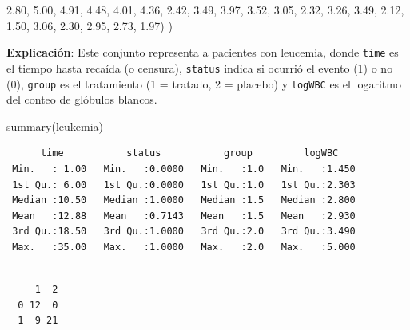 \documentclass[
]{article}
\newenvironment{Shaded}{\begin{snugshade}}{\end{snugshade}}
\newcommand{\FloatTok}[1]{\textcolor[rgb]{0.68,0.00,0.00}{#1}}
\newcommand{\FunctionTok}[1]{\textcolor[rgb]{0.28,0.35,0.67}{#1}}
\newcommand{\NormalTok}[1]{\textcolor[rgb]{0.00,0.23,0.31}{#1}}
\newcommand{\SpecialCharTok}[1]{\textcolor[rgb]{0.37,0.37,0.37}{#1}}
\begin{document}
\begin{Shaded}
\begin{Highlighting}[]
             \FloatTok{2.80}\NormalTok{, }\FloatTok{5.00}\NormalTok{, }\FloatTok{4.91}\NormalTok{, }\FloatTok{4.48}\NormalTok{, }\FloatTok{4.01}\NormalTok{, }\FloatTok{4.36}\NormalTok{, }\FloatTok{2.42}\NormalTok{, }\FloatTok{3.49}\NormalTok{, }\FloatTok{3.97}\NormalTok{, }
             \FloatTok{3.52}\NormalTok{, }\FloatTok{3.05}\NormalTok{, }\FloatTok{2.32}\NormalTok{, }\FloatTok{3.26}\NormalTok{, }\FloatTok{3.49}\NormalTok{, }\FloatTok{2.12}\NormalTok{, }\FloatTok{1.50}\NormalTok{, }\FloatTok{3.06}\NormalTok{, }\FloatTok{2.30}\NormalTok{, }\FloatTok{2.95}\NormalTok{, }\FloatTok{2.73}\NormalTok{, }\FloatTok{1.97}\NormalTok{)}
\NormalTok{)}
\end{Highlighting}
\end{Shaded}

\textbf{Explicación}: Este conjunto representa a pacientes con leucemia,
donde \texttt{time} es el tiempo hasta recaída (o censura),
\texttt{status} indica si ocurrió el evento (1) o no (0), \texttt{group}
es el tratamiento (1 = tratado, 2 = placebo) y \texttt{logWBC} es el
logaritmo del conteo de glóbulos blancos.

\begin{Shaded}
\begin{Highlighting}[]
\FunctionTok{summary}\NormalTok{(leukemia)}
\end{Highlighting}
\end{Shaded}

\begin{verbatim}
      time           status           group         logWBC     
 Min.   : 1.00   Min.   :0.0000   Min.   :1.0   Min.   :1.450  
 1st Qu.: 6.00   1st Qu.:0.0000   1st Qu.:1.0   1st Qu.:2.303  
 Median :10.50   Median :1.0000   Median :1.5   Median :2.800  
 Mean   :12.88   Mean   :0.7143   Mean   :1.5   Mean   :2.930  
 3rd Qu.:18.50   3rd Qu.:1.0000   3rd Qu.:2.0   3rd Qu.:3.490  
 Max.   :35.00   Max.   :1.0000   Max.   :2.0   Max.   :5.000  
\end{verbatim}

\begin{Shaded}
\end{Shaded}

\begin{verbatim}
   
     1  2
  0 12  0
  1  9 21
\end{verbatim}
\end{document}
